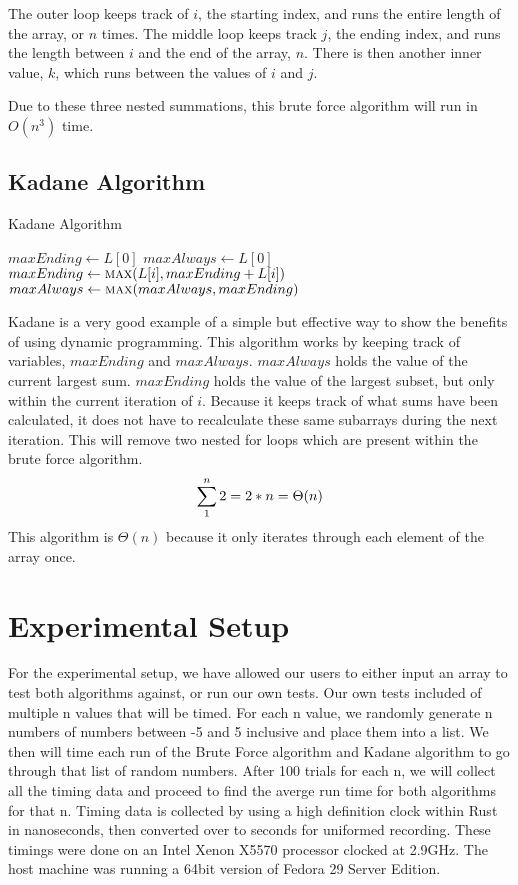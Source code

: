\documentclass[10pt, letterpaper]{article}
\begin{document}
	The outer loop keeps track of $i$, the starting index, and runs the entire length of the array, or $n$ times.
	The middle loop keeps track $j$, the ending index, and runs the length between $i$ and the end of the array, $n$.
	There is then another inner value, $k$, which runs between the values of $i$ and $j$.

	Due to these three nested summations, this brute force algorithm will run in $O(n^3)$ time.

	\subsection{Kadane Algorithm}

  \begin{algorithm}
		\caption{Kadane Algorithm}\label{kadane}
	\begin{algorithmic}
    \State $maxEnding \gets L[0]$
    \State $maxAlways \gets L[0]$
    \State $maxEnding \gets \Call{max}{L[i], maxEnding + L[i]}$
    \State $maxAlways \gets \Call{max}{maxAlways, maxEnding}$
    \EndFor
	  \EndFunction
	\end{algorithmic}
	\end{algorithm}

  Kadane is a very good example of a simple but effective way to show the benefits of using dynamic programming.
  This algorithm works by keeping track of variables, $maxEnding$ and $maxAlways$.
  $maxAlways$ holds the value of the current largest sum.
  $maxEnding$ holds the value of the largest subset, but only within the current iteration of $i$.
  Because it keeps track of what sums have been calculated, it does not have to recalculate these same subarrays during the next iteration.
  This will remove two nested for loops which are present within the brute force algorithm.
  \\
  \[
  \sum_1^n2 \\
  = 2 * n \\
  = \Theta(n)
		\]
	  This algorithm is $\Theta(n)$ because it only iterates through each element of the array once.
    \\
	  \section{Experimental Setup}

	For the experimental setup, we have allowed our users to either input an array to test both algorithms against, or run our own tests.
  Our own tests included of multiple n values that will be timed. For each n value, we randomly generate n numbers of numbers between -5 and 5 inclusive and place them into a list. We then will time each run of the Brute Force algorithm and Kadane algorithm to go through that list of random numbers. After 100 trials for each n, we will collect all the timing data and proceed to find the averge run time for both algorithms for that n.
  Timing data is collected by using a high definition clock within Rust in nanoseconds, then converted over to seconds for uniformed recording. These timings were done on an Intel Xenon X5570 processor clocked at 2.9GHz. The host machine was running a 64bit version of Fedora 29 Server Edition.
\\
\end{document}
